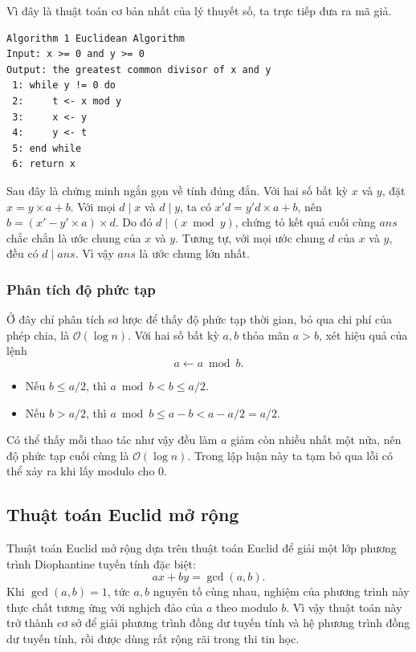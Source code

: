 \documentclass[11pt]{article}
\newcommand{\Oh}{\mathcal{O}}
\begin{document}
Vì đây là thuật toán cơ bản nhất của lý thuyết số, ta trực tiếp đưa ra mã giả.

\begin{verbatim}
Algorithm 1 Euclidean Algorithm
Input: x >= 0 and y >= 0
Output: the greatest common divisor of x and y
 1: while y != 0 do
 2:     t <- x mod y
 3:     x <- y
 4:     y <- t
 5: end while
 6: return x
\end{verbatim}

Sau đây là chứng minh ngắn gọn về tính đúng đắn. Với hai số bất kỳ $x$ và $y$,
đặt $x=y\times a+b$. Với mọi $d\mid x$ và $d\mid y$, ta có
$x'd=y'd\times a+b$, nên $b=(x'-y'\times a)\times d$. Do đó
$d\mid (x\bmod y)$, chứng tỏ kết quả cuối cùng $\mathit{ans}$ chắc chắn là
ước chung của $x$ và $y$. Tương tự, với mọi ước chung $d$ của $x$ và $y$, đều
có $d\mid \mathit{ans}$. Vì vậy $\mathit{ans}$ là ước chung lớn nhất.

\subsubsection{Phân tích độ phức tạp}

Ở đây chỉ phân tích sơ lược để thấy độ phức tạp thời gian, bỏ qua chi phí của
phép chia, là $\Oh(\log n)$. Với hai số bất kỳ $a,b$ thỏa mãn $a>b$, xét hiệu
quả của lệnh
\[
  a\gets a\bmod b.
\]

\begin{itemize}
  \item Nếu $b\le a/2$, thì $a\bmod b<b\le a/2$.
  \item Nếu $b>a/2$, thì $a\bmod b\le a-b<a-a/2=a/2$.
\end{itemize}

Có thể thấy mỗi thao tác như vậy đều làm $a$ giảm còn nhiều nhất một nửa, nên
độ phức tạp cuối cùng là $\Oh(\log n)$. Trong lập luận này ta tạm bỏ qua lỗi
có thể xảy ra khi lấy modulo cho $0$.

\subsection{Thuật toán Euclid mở rộng}

Thuật toán Euclid mở rộng dựa trên thuật toán Euclid để giải một lớp phương
trình Diophantine tuyến tính đặc biệt:
\[
  ax+by=\gcd(a,b).
\]
Khi $\gcd(a,b)=1$, tức $a,b$ nguyên tố cùng nhau, nghiệm của phương trình này
thực chất tương ứng với nghịch đảo của $a$ theo modulo $b$. Vì vậy thuật toán
này trở thành cơ sở để giải phương trình đồng dư tuyến tính và hệ phương trình
đồng dư tuyến tính, rồi được dùng rất rộng rãi trong thi tin học.
\end{document}
